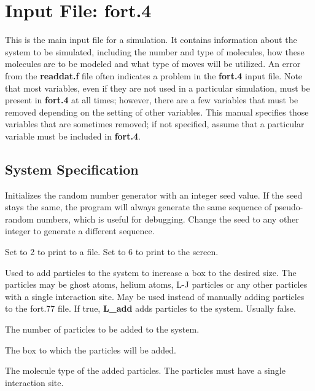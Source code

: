 \documentclass[12pt,letterpaper]{article}
\begin{document}
\newpage

\section{Input File: {\textbf{fort.4}}}

\noindent This is the main input file for a simulation.  It contains information about the system to be simulated,
including the number and type of molecules, how these molecules are to be modeled and what type of
moves will be utilized.  An error from the {\textbf{readdat.f}} file often indicates a problem in the {\textbf{fort.4}} input file.
Note that most variables, even if they are not used in a particular simulation, must be present in {\bf fort.4} at all times;
however, there are a few variables that must be removed depending on the setting of other variables.  
This manual specifies those variables that are sometimes removed; if not specified, assume that a particular variable 
must be included in {\bf fort.4}.

\subsection{System Specification}

 Initializes the random number generator with an
integer seed value. If the seed stays the same, the program will
always generate the same sequence of pseudo-random numbers, which is useful for
debugging.  Change the seed to any other integer to generate a different sequence.  

 Set to 2 to print to a file.  Set to 6 to print to the screen.

 Used to add particles to the system to increase a box to the desired size.
The particles may be ghost atoms, helium atoms, L-J particles or any other particles with a single interaction site.
May be used instead of manually adding particles to the fort.77 file.  If true, {\textbf{L\_add}} adds particles
to the system.  Usually false.

 The number of particles to be added to the system. 

 The box to which the particles will be added.

 The molecule type of the added particles.  The particles must have a 
single interaction site.
\end{document}
